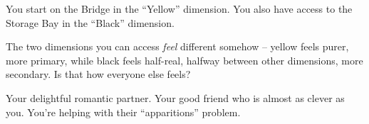 \documentclass[char]{TMFHope}
\begin{document}
\begin{itemz}[Notes]
	\item You start on the Bridge in the ``Yellow'' dimension. You also have access to the Storage Bay in the ``Black'' dimension.
	\item The two dimensions you can access {\em feel} different somehow -- yellow feels purer, more primary, while black feels half-real, halfway between other dimensions, more secondary.  Is that how everyone else feels?
\end{itemz}

\begin{contacts}
	\contact{\cXO{}} Your delightful romantic partner. 
	\contact{\cMed{}} Your good friend who is almost as clever as you.
	\contact{\cCap{}}You're helping \cCap{\them} with their ``apparitions'' problem.
\end{contacts}
\end{document}

